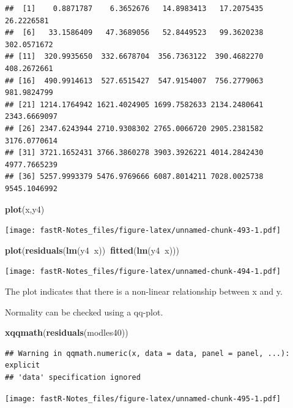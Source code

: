 \documentclass[]{book}
\newenvironment{Shaded}{\begin{snugshade}}{\end{snugshade}}
\newcommand{\KeywordTok}[1]{\textcolor[rgb]{0.13,0.29,0.53}{\textbf{#1}}}
\newcommand{\OperatorTok}[1]{\textcolor[rgb]{0.81,0.36,0.00}{\textbf{#1}}}
\newcommand{\NormalTok}[1]{#1}
\theoremstyle{definition}
\theoremstyle{definition}
\theoremstyle{definition}
\theoremstyle{remark}
\begin{document}
\begin{verbatim}
##  [1]    0.8871787    6.3652676   14.8983413   17.2075435   26.2226581
##  [6]   33.1586409   47.3689056   52.8449523   99.3620238  302.0571672
## [11]  320.9935650  332.6678704  356.7363122  390.4682270  408.2672661
## [16]  490.9914613  527.6515427  547.9154007  756.2779063  981.9824799
## [21] 1214.1764942 1621.4024905 1699.7582633 2134.2480641 2343.6669097
## [26] 2347.6243944 2710.9308302 2765.0066720 2905.2381582 3176.0770614
## [31] 3721.1652431 3766.3860278 3903.3926221 4014.2842430 4977.7665239
## [36] 5257.9993379 5476.9769666 6087.8014211 7028.0025738 9545.1046992
\end{verbatim}

\begin{Shaded}
\begin{Highlighting}[]
\KeywordTok{plot}\NormalTok{(x,y4)}
\end{Highlighting}
\end{Shaded}

\texttt{[image: fastR-Notes\_files/figure-latex/unnamed-chunk-493-1.pdf]}

\begin{Shaded}
\begin{Highlighting}[]
\KeywordTok{plot}\NormalTok{(}\KeywordTok{residuals}\NormalTok{(}\KeywordTok{lm}\NormalTok{(y4}\OperatorTok{~}\NormalTok{x))}\OperatorTok{~}\KeywordTok{fitted}\NormalTok{(}\KeywordTok{lm}\NormalTok{(y4}\OperatorTok{~}\NormalTok{x)))}
\end{Highlighting}
\end{Shaded}

\texttt{[image: fastR-Notes\_files/figure-latex/unnamed-chunk-494-1.pdf]}

The plot indicates that there is a non-linear relationship between x and
y.

Normality can be checked using a qq-plot.

\begin{Shaded}
\begin{Highlighting}[]
\KeywordTok{xqqmath}\NormalTok{(}\KeywordTok{residuals}\NormalTok{(modles40))}
\end{Highlighting}
\end{Shaded}

\begin{verbatim}
## Warning in qqmath.numeric(x, data = data, panel = panel, ...): explicit
## 'data' specification ignored
\end{verbatim}

\texttt{[image: fastR-Notes\_files/figure-latex/unnamed-chunk-495-1.pdf]}
\end{document}
